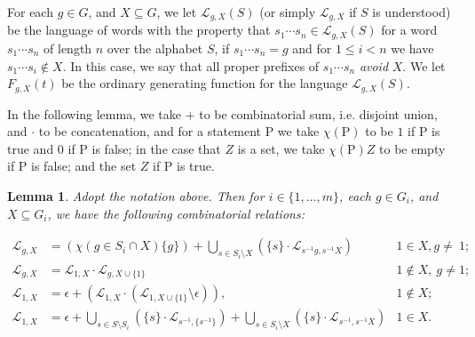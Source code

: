 \documentclass[11pt]{amsart}
\newtheorem{lemma}[theorem]{Lemma}
\theoremstyle{definition}
\newcommand{\unone}[1]{#1\cup\{1\}}
\newcommand{\mcl}{\mathcal{L}}
\begin{document}
For each $g\in G$, and $X\subseteq G$, we let $\mcl_{g, X}(S)$ (or
simply $\mcl_{g,X}$ if $S$ is understood) be the language of words
with the property that $s_1\cdots s_n \in \mathcal{L}_{g, X}(S)$ for a word $s_1\cdots s_n$ of length $n$ over the alphabet $S$, if $s_1\cdots s_n = g$
and for $1\le i<n$ we have $s_1\cdots s_i\not\in X$.  In this case, we
say that all proper prefixes of $s_1\cdots s_n$ \emph{avoid} $X$. We let
$F_{g,X}(t)$ be the ordinary generating function for the language $\mathcal{L}_{g,X}(S)$.

In the following lemma, we take $+$ to be combinatorial sum, i.e. disjoint
  union, and $\cdot$ to be concatenation, and for a statement $\mathrm{P}$ we take $\chi(\mathrm{P})$ to be $1$ if $\mathrm{P}$ is true and $0$ if $\mathrm{P}$ is false; in the case that $Z$ is a set, we take $\chi(\mathrm{P})Z$ to be empty if $\mathrm{P}$ is false; and the set $Z$ if $\mathrm{P}$ is true.  
  \begin{lemma}\label{lem:eq} Adopt the notation above.  Then for $i\in\{1,\ldots ,
  m\}$, each $g\in G_i$, and $X\subseteq G_i$, we have the following
  combinatorial relations:
  
\begin{align}
\label{lem:eq:case_1inX_gnot1}
\mcl _{g,X}&=\left(\chi\left(g\in S_i\cap X\right)\{g\} \right) 
                           + \bigcup_{s\in S_i\setminus X}
                   \left(\{s\}\cdot
                   \mcl _{s^{-1}g,s^{-1}X}\right)& 1\in X, g\neq~1;\\
\label{lem:eq:case_1notinX_gnot1}
\mcl _{g,X}&=\mcl _{1,X}\cdot \mcl _{g,\unone{X}}&1\notin X,\ g\neq 1;\\
\label{lem:eq:case_1notinX_g1}
\mcl _{1,X}&=\epsilon + \left(\mcl _{1,X}\cdot \left(\mcl _{1,\unone{X}}\setminus\epsilon\right)\right),&1\notin X;\\
\label{lem:eq:case_1inX_g1}
\mcl _{1,X}&=\epsilon + \bigcup_{s\in S\setminus
                   S_i}\left(\{s\}\cdot
                   \mcl _{s^{-1},\{s^{-1}\}}\right)+\bigcup_{s\in
                   S_i\setminus X}\left(\{s\}\cdot
                   \mcl _{s^{-1},s^{-1}X}\right)&1\in  X.
\end{align}
\end{lemma}
\end{document}
